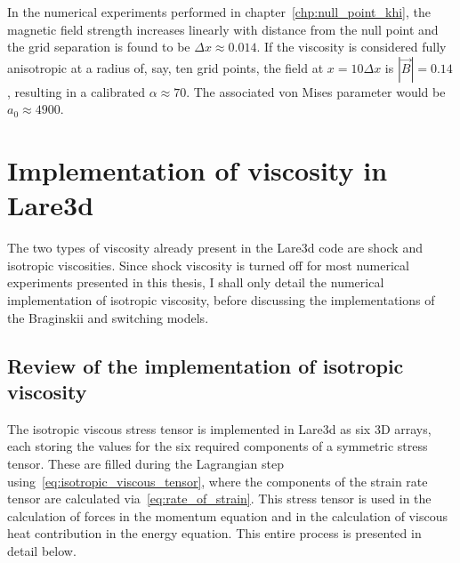 In the numerical experiments performed in chapter~\ref{chp:null_point_khi}, the magnetic field strength increases linearly with distance from the null point and the grid separation is found to be $\Delta x \approx 0.014$. If the viscosity is considered fully anisotropic at a radius of, say, ten grid points, the field at $x = 10 \Delta x$ is $|\vec{B}| = 0.14$, resulting in a calibrated $\alpha \approx 70$. The associated von Mises parameter would be $a_0 \approx 4900$. 

\section{Implementation of viscosity in Lare3d}

The two types of viscosity already present in the Lare3d code are shock and isotropic viscosities. Since shock viscosity is turned off for most numerical experiments presented in this thesis, I shall only detail the numerical implementation of isotropic viscosity, before discussing the implementations of the Braginskii and switching models.

\subsection{Review of the implementation of isotropic viscosity}

The isotropic viscous stress tensor is implemented in Lare3d as six 3D arrays, each storing the values for the six required components of a symmetric stress tensor. These are filled during the Lagrangian step using~\eqref{eq:isotropic_viscous_tensor}, where the components of the strain rate tensor are calculated via~\eqref{eq:rate_of_strain}. This stress tensor is used in the calculation of forces in the momentum equation and in the calculation of viscous heat contribution in the energy equation. This entire process is presented in detail below.

